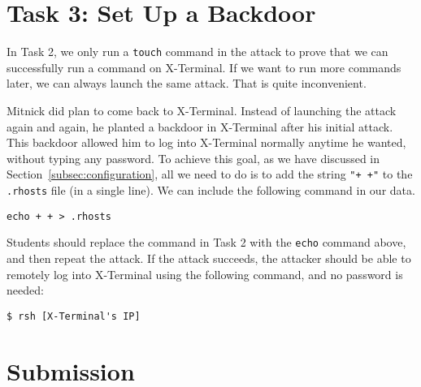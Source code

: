 \section{Task 3: Set Up a Backdoor}

In Task 2, we only run a \texttt{touch} command in the attack to prove that we can
successfully run a command on X-Terminal. If we want to run
more commands later, we can always launch the same attack. That is quite inconvenient. 

Mitnick did plan to come back to X-Terminal. Instead of launching the attack
again and again, he planted a backdoor in X-Terminal after his initial attack. 
This backdoor allowed him to log into X-Terminal normally anytime he wanted, without 
typing any password. 
To achieve this goal, as we have discussed in 
Section~\ref{subsec:configuration}, 
all we need to do is to add the string \texttt{"+ +"} to
the \texttt{.rhosts} file (in a single line). We can
include the following command in our \rsh data.

\begin{lstlisting}
echo + + > .rhosts
\end{lstlisting}

Students should replace the \rsh command in Task 2 with
the \texttt{echo} command above, and then repeat the attack.   
If the attack succeeds, the attacker should be able to 
remotely log into X-Terminal using the following command,
and no password is needed: 

\begin{lstlisting}
$ rsh [X-Terminal's IP]
\end{lstlisting}



\section{Submission}

\seedsubmission







